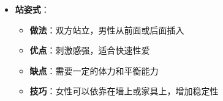 \documentclass[12pt,UTF8]{ctexbook}
\begin{document}
\begin{itemize}
\begin{itemize}
		\item \textbf{缺点}：插入深度可能有限
		\item \textbf{技巧}：女性可以前后移动，控制插入深度
	\end{itemize}
	\item \textbf{站姿式}：
	\begin{itemize}
		\item \textbf{做法}：双方站立，男性从前面或后面插入
		\item \textbf{优点}：刺激感强，适合快速性爱
		\item \textbf{缺点}：需要一定的体力和平衡能力
		\item \textbf{技巧}：女性可以依靠在墙上或家具上，增加稳定性
	\end{itemize}
\end{itemize}
\end{document}
